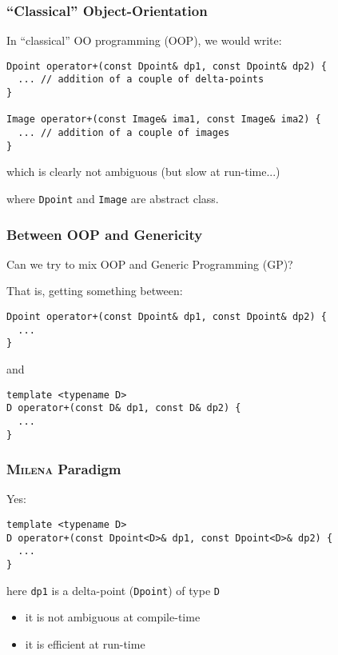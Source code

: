 \documentclass{beamer}
\newcommand{\code}[1]{{\scriptsize{\texttt{#1}}}\xspace}
\newcommand{\mln}{\textsc{Milena}\xspace}
\begin{document}
\begin{frame}[fragile]
  \frametitle{``Classical'' Object-Orientation}

In ``classical'' OO programming (OOP), we would write:
\begin{lstlisting}
Dpoint operator+(const Dpoint& dp1, const Dpoint& dp2) {
  ... // addition of a couple of delta-points
}

Image operator+(const Image& ima1, const Image& ima2) {
  ... // addition of a couple of images
}
\end{lstlisting}
which is clearly not ambiguous (but slow at run-time...)

where \code{Dpoint} and \code{Image} are abstract class.

\end{frame}


\begin{frame}[fragile]
  \frametitle{Between OOP and Genericity}

Can we try to mix OOP and Generic Programming (GP)?

\medskip

That is, getting something between:

\begin{lstlisting}
Dpoint operator+(const Dpoint& dp1, const Dpoint& dp2) {
  ...
}
\end{lstlisting}
and
\begin{lstlisting}
template <typename D>
D operator+(const D& dp1, const D& dp2) {
  ...
}
\end{lstlisting}

\end{frame}



\begin{frame}[fragile]
  \frametitle{\mln Paradigm}

Yes:

\begin{lstlisting}
template <typename D>
D operator+(const Dpoint<D>& dp1, const Dpoint<D>& dp2) {
  ...
}
\end{lstlisting}

\begin{center}
  here \code{dp1} is a delta-point (\code{Dpoint}) of type \code{D}
\end{center}

\medskip

\begin{itemize}
\item it is not ambiguous at compile-time
\item it is efficient at run-time\\
  \scriptsize{}
\end{itemize}

\end{frame}
\end{document}
